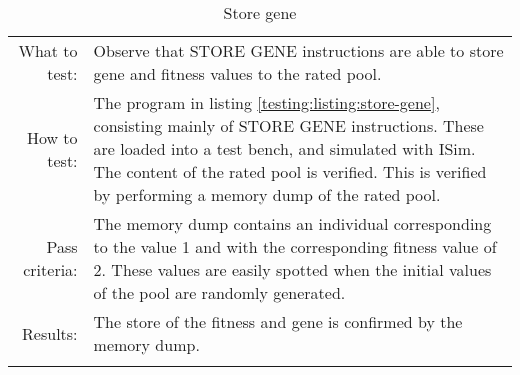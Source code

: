 \begin{table}[H]
  \begin{tabular}{r | p{8cm}}
    \noalign{\smallskip}\hline\noalign{\smallskip}
    
    What to test:  & Observe that STORE GENE instructions are able to store gene and fitness values
                     to the rated pool.  \\

    \noalign{\smallskip}\hline\noalign{\smallskip}

    How to test:   &  The program in listing \ref{testing:listing:store-gene}, consisting mainly of 
                       STORE GENE instructions. These are loaded into a test bench, and 
                       simulated with ISim. The content of the rated pool is verified. This is verified by performing a memory dump of the rated pool.
                      \\

    \noalign{\smallskip}\hline\noalign{\smallskip}

    Pass criteria: &  The memory dump contains an individual corresponding to the value 1 and with the corresponding fitness value of 2. These values are easily spotted when the initial values of the pool are randomly generated.     \\

    \noalign{\smallskip}\hline\noalign{\smallskip}
    
    Results: & The store of the fitness and gene is confirmed by the memory dump.   \\
   \noalign{\smallskip}\hline\noalign{\smallskip}
  
  
  
  \end{tabular}
  \caption{Store gene}
  \label{testing:fitness:store_gene}
\end{table}
